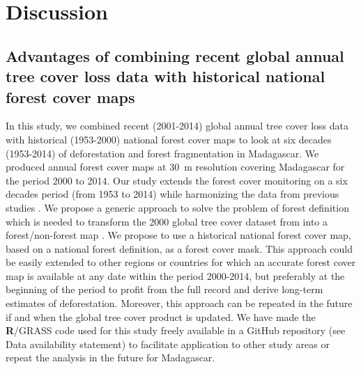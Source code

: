 \documentclass[a4paper, 12pt, leqno]{article}\usepackage[]{graphicx}\usepackage[]{color}
\newcommand{\R}{\textnormal{\sffamily\bfseries R}}
\begin{document}
\newpage

\section{Discussion}
\label{discussion}

\subsection{Advantages of combining recent global annual tree cover loss
  data with historical national forest cover maps}

In this study, we combined recent (2001-2014) global annual tree cover
loss data \citep{Hansen2013} with historical (1953-2000) national
forest cover maps \citep{Harper2007} to look at six decades
(1953-2014) of deforestation and forest fragmentation in
Madagascar. We produced annual forest cover maps at 30~m resolution
covering Madagascar for the period 2000 to 2014. Our study extends the
forest cover monitoring on a six decades period (from 1953 to 2014)
while harmonizing the data from previous studies \citep{Harper2007,
  MEFT2009, ONE2015}. We propose a generic approach to solve the
problem of forest definition which is needed to transform the 2000
global tree cover dataset from \citet{Hansen2013} into a
forest/non-forest map \citep{Tropek2014}. We propose to use a
historical national forest cover map, based on a national forest
definition, as a forest cover mask. This approach could be easily
extended to other regions or countries for which an accurate
forest cover map is available at any date within the period 2000-2014,
but preferably at the beginning of the period to profit from the full
record and derive long-term estimates of deforestation. Moreover, this
approach can be repeated in the future if and when the global tree
cover product is updated. We have made the \R{}/GRASS code used for this
study freely available in a GitHub repository (see Data availability
statement) to facilitate application to other study areas or repeat
the analysis in the future for Madagascar.
\end{document}
